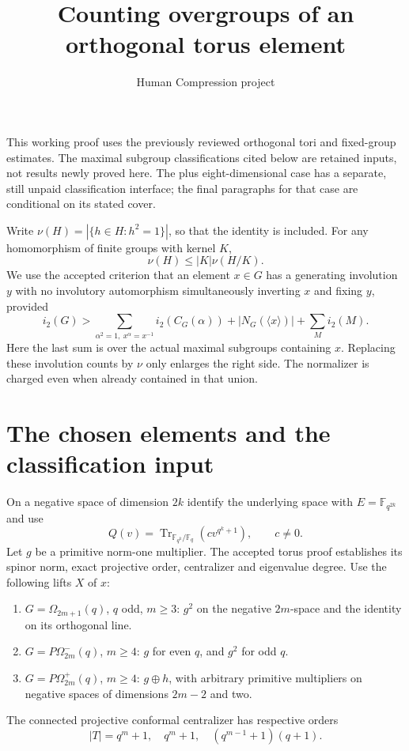 \documentclass[11pt,a4paper]{article}
\title{Counting overgroups of an orthogonal torus element}
\author{Human Compression project}\date{}
\newcommand{\F}{\mathbb F}\newcommand{\Om}{\Omega}
\newcommand{\Tr}{\operatorname{Tr}}
\begin{document}
\maketitle
This working proof uses the previously reviewed orthogonal tori and
fixed-group estimates. The maximal subgroup classifications cited below
are retained inputs, not results newly proved here. The plus eight-dimensional
case has a separate, still unpaid classification interface; the final
paragraphs for that case are conditional on its stated cover.

Write $\nu(H)=|\{h\in H:h^2=1\}|$, so that the identity is included.
For any homomorphism of finite groups with kernel $K$,
\begin{equation}\label{kernel}
                         \nu(H)\le |K|\nu(H/K).
\end{equation}
We use the accepted criterion that an element $x\in G$ has a generating
involution $y$ with no involutory automorphism simultaneously inverting
$x$ and fixing $y$, provided
\begin{equation}\label{criterion}
 i_2(G)> \sum_{\alpha^2=1,\ x^\alpha=x^{-1}}i_2(C_G(\alpha))
             +|N_G(\langle x\rangle)|+\sum_M i_2(M).
\end{equation}
Here the last sum is over the actual maximal subgroups containing $x$.
Replacing these involution counts by $\nu$ only enlarges the right side.
The normalizer is charged even when already contained in that union.

\section{The chosen elements and the classification input}
On a negative space of dimension $2k$ identify the underlying space with
$E=\F_{q^{2k}}$ and use
\[
 Q(v)=\Tr_{\F_{q^k}/\F_q}(c v^{q^k+1}),\qquad c\ne0.
\]
Let $g$ be a primitive norm-one multiplier. The accepted torus proof
establishes its spinor norm, exact projective order, centralizer and
eigenvalue degree. Use the following lifts $X$ of $x$:
\begin{enumerate}
\item $G=\Om_{2m+1}(q)$, $q$ odd, $m\ge3$: $g^2$ on the negative
$2m$-space and the identity on its orthogonal line.
\item $G=P\Om^-_{2m}(q)$, $m\ge4$: $g$ for even $q$, and $g^2$
for odd $q$.
\item $G=P\Om^+_{2m}(q)$, $m\ge4$: $g\oplus h$, with arbitrary
primitive multipliers on negative spaces of dimensions $2m-2$ and two.
\end{enumerate}
The connected projective conformal centralizer has respective orders
\begin{equation}\label{tori}
             |T|=q^m+1,\quad q^m+1,\quad(q^{m-1}+1)(q+1).
\end{equation}
\end{document}
